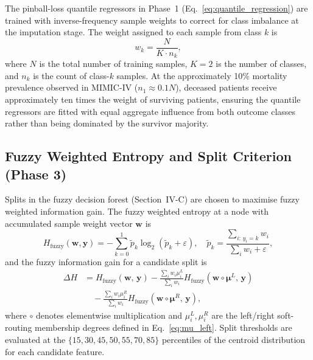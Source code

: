 \documentclass[journal]{IEEEtran}
\begin{document}
	The pinball-loss quantile regressors in Phase~1 (Eq.~\ref{eq:quantile_regression}) are trained with inverse-frequency sample weights to correct for class imbalance at the imputation stage. The weight assigned to each sample from class $k$ is
	\begin{equation}
		w_k = \frac{N}{K \cdot n_k},
		\label{eq:class_weights}
	\end{equation}
	where $N$ is the total number of training samples, $K=2$ is the number of classes, and $n_k$ is the count of class-$k$ samples. At the approximately 10\% mortality prevalence observed in MIMIC-IV ($n_1 \approx 0.1N$), deceased patients receive approximately ten times the weight of surviving patients, ensuring the quantile regressors are fitted with equal aggregate influence from both outcome classes rather than being dominated by the survivor majority.
	
	\subsection{Fuzzy Weighted Entropy and Split Criterion (Phase 3)}
	
	Splits in the fuzzy decision forest (Section~IV-C) are chosen to maximise fuzzy weighted information gain. The fuzzy weighted entropy at a node with accumulated sample weight vector $\mathbf{w}$ is
	\begin{equation}
		H_{\text{fuzzy}}(\mathbf{w}, \mathbf{y})
		= -\sum_{k=0}^{1}
		\tilde{p}_k \log_2(\tilde{p}_k + \varepsilon),
		\quad
		\tilde{p}_k =
		\frac{\sum_{i:\, y_i = k} w_i}{\sum_i w_i + \varepsilon},
		\label{eq:fuzzy_entropy}
	\end{equation}
	and the fuzzy information gain for a candidate split is
\begin{equation}
	\begin{split}
		\Delta H &= H_{\text{fuzzy}}(\mathbf{w},\,\mathbf{y})
		-\frac{\sum_i w_i\mu^L_i}{\sum_i w_i}
		H_{\text{fuzzy}}(\mathbf{w}\circ\boldsymbol{\mu}^L,\,\mathbf{y}) \\
		&\quad
		-\frac{\sum_i w_i\mu^R_i}{\sum_i w_i}
		H_{\text{fuzzy}}(\mathbf{w}\circ\boldsymbol{\mu}^R,\,\mathbf{y}),
	\end{split}
	\label{eq:fuzzy_gain}
\end{equation}
	where $\circ$ denotes elementwise multiplication and $\mu^L_i, \mu^R_i$ are the left/right soft-routing membership degrees defined in Eq.~\ref{eq:mu_left}. Split thresholds are evaluated at the $\{15, 30, 45, 50, 55, 70, 85\}$ percentiles of the centroid distribution for each candidate feature.
	
\end{document}

